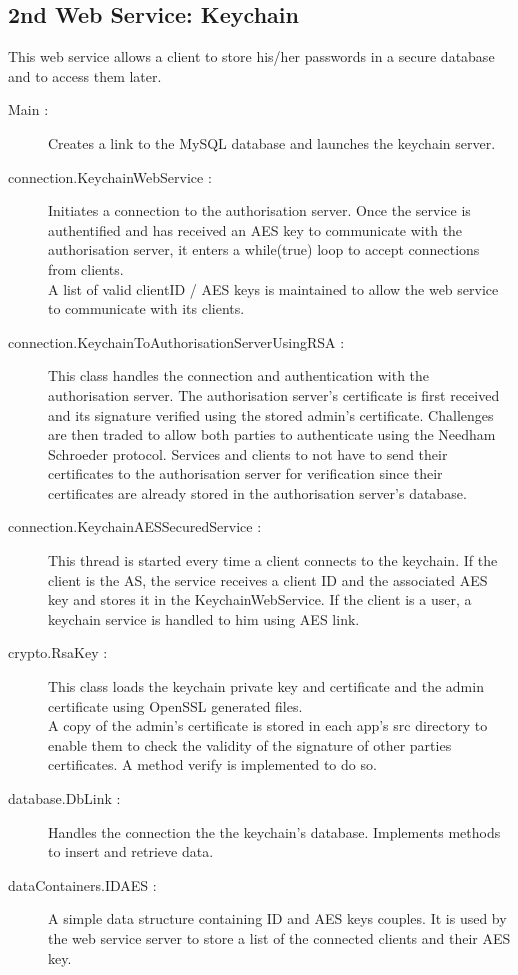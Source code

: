 \subsection{2nd Web Service: Keychain}

This web service allows a client to store his/her passwords in a secure database and to access them later.

\begin{description}

\item[Main :]Creates a link to the MySQL database and launches the keychain server.

\item[connection.KeychainWebService :] Initiates a connection to the authorisation server. Once the service is authentified and has received an AES key to communicate with the authorisation server, it enters a while(true) loop to accept connections from clients. \\
A list of valid clientID / AES keys is maintained to allow the web service to communicate with its clients.


\item[connection.KeychainToAuthorisationServerUsingRSA :] This class handles the connection and authentication with the authorisation server. The authorisation server's certificate is first received and its signature verified using the stored admin's certificate. Challenges are then traded to allow both parties to authenticate using the Needham Schroeder protocol. Services and clients to not have to send their certificates to the authorisation server for verification since their certificates are already stored in the authorisation server's database. 

\item[connection.KeychainAESSecuredService :] This thread is started every time a client connects to the keychain. If the client is the AS, the service receives a client ID and the associated AES key and stores it in the KeychainWebService. If the client is a user, a keychain service is handled to him using AES link.

\item[crypto.RsaKey :]This class loads the keychain private key and certificate and the admin certificate using OpenSSL generated files. \\
A copy of the admin's certificate is stored in each app's src directory to enable them to check the validity of the signature of other parties certificates. A method verify is implemented to do so.

\item[database.DbLink :] Handles the connection the the keychain's database. Implements methods to insert and retrieve data.

\item[dataContainers.IDAES :] A simple data structure containing ID and AES keys couples. It is used by the web service server to store a list of the connected clients and their AES key.

\end{description}


